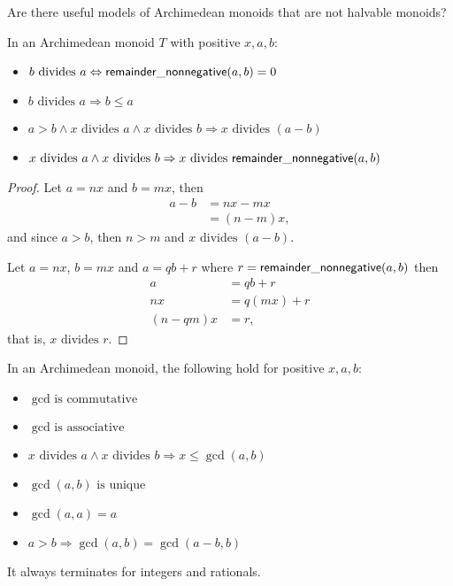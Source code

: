 \begin{project}
	Are there useful models of Archimedean monoids that are not halvable monoids?
\end{project}

\begin{lemma}
	In an Archimedean monoid $T$ with positive $x, a, b$:
	\begin{itemize}
		\item $b \text{ divides } a \Leftrightarrow \mathsf{remainder\_nonnegative}(a, b) = 0$
		\item $b \text{ divides } a \Rightarrow b \leq a$
		\item $a > b \wedge x \text{ divides } a \wedge x \text{ divides } b \Rightarrow x \text{ divides } (a - b)$
		\item $x \text{ divides } a \wedge x \text{ divides } b \Rightarrow x \text{ divides } \mathsf{remainder\_nonnegative}(a, b)$
	\end{itemize}
\end{lemma}

\begin{proof}
	Let $a = nx$ and $b = mx$, then
	\begin{align*}
		a - b &= nx - mx\\
		      &= (n - m)x,
	\end{align*}
	and since $a > b$, then $n > m$ and $x \text{ divides } (a - b)$.

	Let $a = nx$, $b = mx$ and $a = qb + r$ where $r = \mathsf{remainder\_nonnegative}(a, b)$ then
	\begin{align*}
		a &= qb + r\\
		nx &= q(mx) + r\\
		(n - qm)x &= r,
	\end{align*}
	that is, $x \text{ divides } r$.
\end{proof}

\begin{lemma}
	In an Archimedean monoid, the following hold for positive $x, a, b$:
	\begin{itemize}
		\item $\gcd \text{ is commutative}$
		\item $\gcd \text{ is associative}$ 
		\item $x \text{ divides } a \wedge x \text{ divides } b \Rightarrow x \leq \gcd(a, b)$
		\item $\gcd(a, b) \text{ is unique}$
		\item $\gcd(a, a) = a$
		\item $a > b \Rightarrow \gcd(a, b) = \gcd(a - b, b)$
	\end{itemize}
\end{lemma}

\begin{lemma}
	It always terminates for integers and rationals.
\end{lemma}

